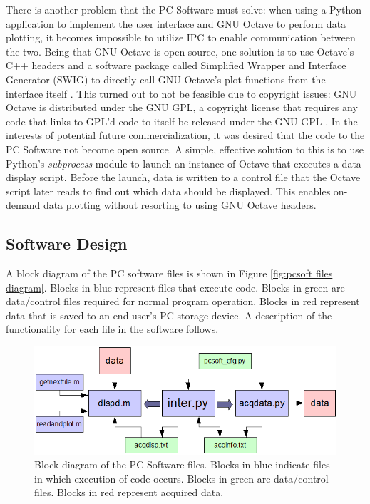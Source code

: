 There is another problem that the PC Software must solve: when using a Python application to 
implement the user interface and GNU Octave to perform data plotting, it becomes impossible to 
utilize IPC to enable communication between the two. Being that GNU Octave is open source, one 
solution is to use Octave's C++ headers and a software package called Simplified Wrapper and Interface
 Generator (SWIG) to directly call  GNU Octave's plot functions from the interface itself \cite{web:swig}. 
This turned out to not be feasible due to copyright issues: GNU Octave is distributed under the GNU 
GPL, a copyright license that requires any code that links to GPL'd code to itself be released under 
the GNU GPL \cite{web:gnugpl}. In the interests of potential future commercialization, it was desired 
that the code to the PC Software not become open source. A simple, effective solution to this is to 
use Python's \textit{subprocess} module to launch an instance of Octave that executes a data display 
script. Before the launch, data is written to a control file that the Octave script later reads 
to find out which data should be displayed. This enables on-demand data plotting without resorting 
to using GNU Octave headers.

\subsection[Software Design]{Software Design}
A block diagram of the PC software files is shown in Figure \ref{fig:pcsoft files diagram}. Blocks 
in blue represent files that execute code. Blocks in green are data/control files required for normal 
program operation. Blocks in red represent data that is saved to an end-user's PC storage device.
 A description of the functionality for each file in the software follows.


\begin{figure}[bhp]
\begin{center}
\includegraphics[scale=0.65]{../drawings/pcsoft_files_diagram.png}
\end{center}
\caption[PC Software Files Block Diagram]{Block diagram of the PC Software files. Blocks in blue
indicate files in which execution of code occurs. Blocks in green are data/control files. Blocks
in red represent acquired data.}
\label{fig:pcsoft sub diagram}
\end{figure}
